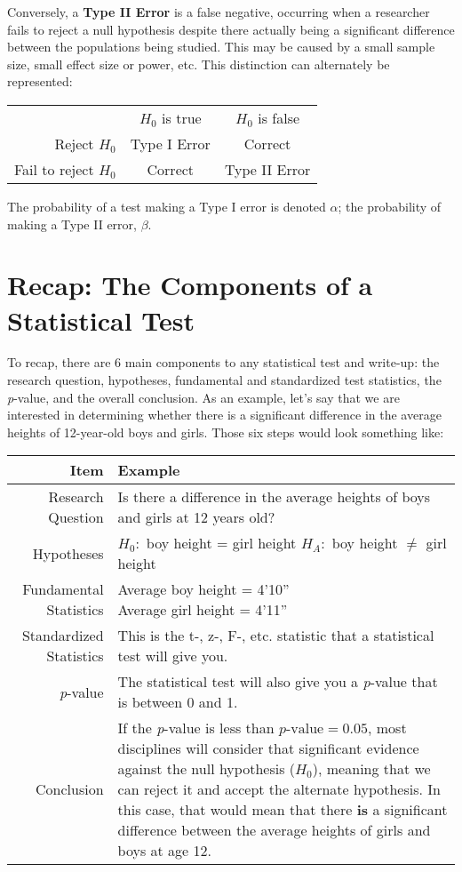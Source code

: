 Conversely, a \textbf{Type II Error} is a false negative, occurring when a researcher fails to reject a null hypothesis despite there actually being a significant difference between the populations being studied. This may be caused by a small sample size, small effect size or power, etc. This distinction can alternately be represented:

\begin{center}
\begin{tabular}{|r c c|}
\hline
& $H_0$ is true & $H_0$ is false \\
 Reject $H_0$ & Type I Error & Correct\\
Fail to reject $H_0$ & Correct & Type II Error\\
\hline
\end{tabular}
\end{center}

The probability of a test making a Type I error is denoted $\alpha$; the probability of making a Type II error, $\beta$.

\section{Recap: The Components of a Statistical Test}

To recap, there are 6 main components to any statistical test and write-up: the research question, hypotheses, fundamental and standardized test statistics, the \textit{p}-value, and the overall conclusion. As an example, let's say that we are interested in determining whether there is a significant difference in the average heights of 12-year-old boys and girls. Those six steps would look something like:

\begin{center}
\begin{tabular}{r l}
Item & Example \\
\hline
Research Question & Is there a difference in the average heights of boys and girls at 12 years old?\\
Hypotheses & \parbox[t]{25pc}{\(H_0:\) boy height = girl height\\\(H_A:\) boy height \(\neq\) girl height}\\
Fundamental Statistics & \parbox[t]{25pc}{Average boy height = 4'10'' \\ Average girl height = 4'11''}\\
Standardized Statistics & This is the t-, z-, F-, etc. statistic that a statistical test will give you.\\
\textit{p}-value & The statistical test will also give you a \textit{p}-value that is between 0 and 1.\\
Conclusion & \parbox[t]{25pc}{If the \textit{p}-value is less than $p\text{-value}=0.05$, most disciplines will consider that significant evidence against the null hypothesis (\(H_0\)), meaning that we can reject it and accept the alternate hypothesis. In this case, that would mean that there \textbf{is} a significant difference between the average heights of girls and boys at age 12.}
\end{tabular}
\end{center}

